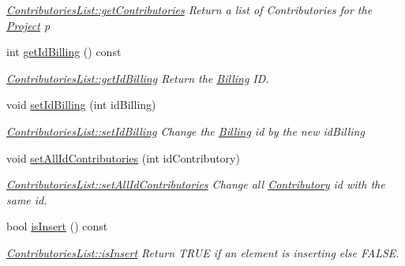\begin{DoxyCompactItemize}
\begin{DoxyCompactList}\small\item\em \hyperlink{classModels_1_1ContributoriesList_a2549547fd3866d879ebbfd1f38145fc5}{Contributories\-List\-::get\-Contributories} Return a list of Contributories for the \hyperlink{classModels_1_1Project}{Project} {\itshape p} \end{DoxyCompactList}\item 
int \hyperlink{classModels_1_1ContributoriesList_a3fbbce49ffcdbfa0693f4d21dd0d8c14}{get\-Id\-Billing} () const 
\begin{DoxyCompactList}\small\item\em \hyperlink{classModels_1_1ContributoriesList_a3fbbce49ffcdbfa0693f4d21dd0d8c14}{Contributories\-List\-::get\-Id\-Billing} Return the \hyperlink{classModels_1_1Billing}{Billing} I\-D. \end{DoxyCompactList}\item 
void \hyperlink{classModels_1_1ContributoriesList_ad93d74f1b3e0a4ad83bad859812b3547}{set\-Id\-Billing} (int id\-Billing)
\begin{DoxyCompactList}\small\item\em \hyperlink{classModels_1_1ContributoriesList_ad93d74f1b3e0a4ad83bad859812b3547}{Contributories\-List\-::set\-Id\-Billing} Change the \hyperlink{classModels_1_1Billing}{Billing} id by the new {\itshape id\-Billing} \end{DoxyCompactList}\item 
void \hyperlink{classModels_1_1ContributoriesList_a313800788580eb469df125fe8d47c6a6}{set\-All\-Id\-Contributories} (int id\-Contributory)
\begin{DoxyCompactList}\small\item\em \hyperlink{classModels_1_1ContributoriesList_a313800788580eb469df125fe8d47c6a6}{Contributories\-List\-::set\-All\-Id\-Contributories} Change all \hyperlink{classModels_1_1Contributory}{Contributory} id with the same id. \end{DoxyCompactList}\item 
bool \hyperlink{classModels_1_1ContributoriesList_a286c41aee939305541eeadfa64ee17a7}{is\-Insert} () const 
\begin{DoxyCompactList}\small\item\em \hyperlink{classModels_1_1ContributoriesList_a286c41aee939305541eeadfa64ee17a7}{Contributories\-List\-::is\-Insert} Return T\-R\-U\-E if an element is inserting else F\-A\-L\-S\-E. \end{DoxyCompactList}\item 

\end{DoxyCompactItemize}
